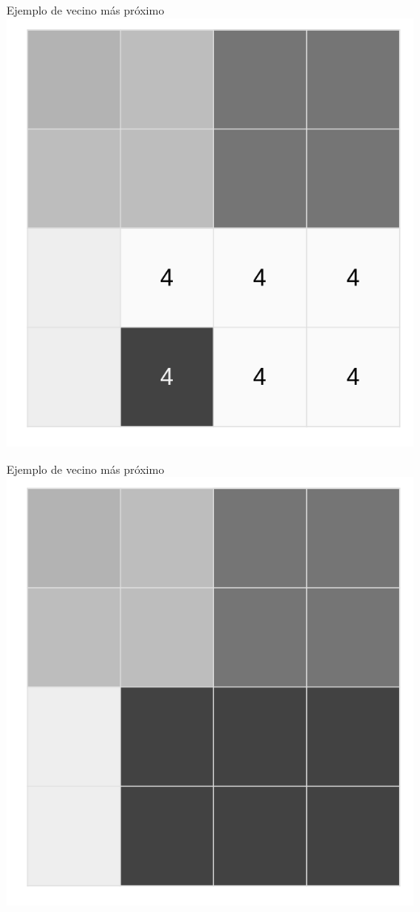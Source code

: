 \documentclass[
  11pt,
  ignorenonframetext,
]{beamer}
\begin{document}
\begin{frame}{Ejemplo de vecino más próximo}
\protect\hypertarget{ejemplo-de-vecino-muxe1s-pruxf3ximo-5}{}
\includegraphics{Interpolacion/Ejemplo-vecino-5.png}
\end{frame}

\begin{frame}{Ejemplo de vecino más próximo}
\protect\hypertarget{ejemplo-de-vecino-muxe1s-pruxf3ximo-6}{}
\includegraphics{Interpolacion/Ejemplo-vecino-6.png}
\end{frame}
\end{document}
